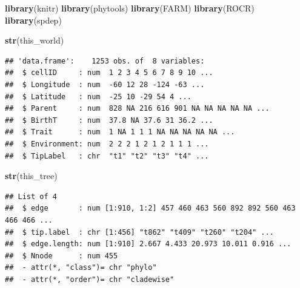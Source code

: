\documentclass[]{book}
\newenvironment{Shaded}{\begin{snugshade}}{\end{snugshade}}
\newcommand{\KeywordTok}[1]{\textcolor[rgb]{0.13,0.29,0.53}{\textbf{{#1}}}}
\newcommand{\StringTok}[1]{\textcolor[rgb]{0.31,0.60,0.02}{{#1}}}
\newcommand{\OperatorTok}[1]{\textcolor[rgb]{0.81,0.36,0.00}{\textbf{{#1}}}}
\newcommand{\NormalTok}[1]{{#1}}
\theoremstyle{definition}
\theoremstyle{definition}
\theoremstyle{definition}
\theoremstyle{remark}
\begin{document}
\begin{Shaded}
\begin{Highlighting}[]
\KeywordTok{library}\NormalTok{(knitr)}
\KeywordTok{library}\NormalTok{(phytools)}
\KeywordTok{library}\NormalTok{(FARM)}
\KeywordTok{library}\NormalTok{(ROCR)}
\KeywordTok{library}\NormalTok{(spdep)}
\end{Highlighting}
\end{Shaded}

\begin{Shaded}
\end{Shaded}

\begin{Shaded}
\begin{Highlighting}[]
\KeywordTok{str}\NormalTok{(this_world)}
\end{Highlighting}
\end{Shaded}

\begin{verbatim}
## 'data.frame':    1253 obs. of  8 variables:
##  $ cellID     : num  1 2 3 4 5 6 7 8 9 10 ...
##  $ Longitude  : num  -60 12 28 -124 -63 ...
##  $ Latitude   : num  -25 10 -29 54 4 ...
##  $ Parent     : num  828 NA 216 616 901 NA NA NA NA NA ...
##  $ BirthT     : num  37.8 NA 37.6 31 36.2 ...
##  $ Trait      : num  1 NA 1 1 1 NA NA NA NA NA ...
##  $ Environment: num  2 2 2 1 2 1 2 1 1 1 ...
##  $ TipLabel   : chr  "t1" "t2" "t3" "t4" ...
\end{verbatim}

\begin{Shaded}
\begin{Highlighting}[]
\KeywordTok{str}\NormalTok{(this_tree)}
\end{Highlighting}
\end{Shaded}

\begin{verbatim}
## List of 4
##  $ edge       : num [1:910, 1:2] 457 460 463 560 892 892 560 463 466 466 ...
##  $ tip.label  : chr [1:456] "t862" "t409" "t260" "t204" ...
##  $ edge.length: num [1:910] 2.667 4.433 20.973 10.011 0.916 ...
##  $ Nnode      : num 455
##  - attr(*, "class")= chr "phylo"
##  - attr(*, "order")= chr "cladewise"
\end{verbatim}
\end{document}
